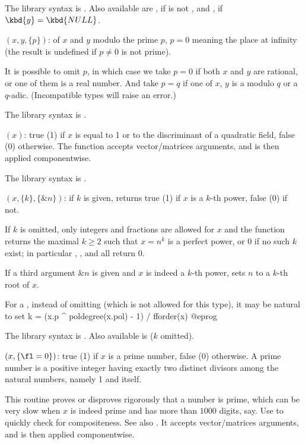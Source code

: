 The library syntax is .
Also available are , if  is not
, and , if $\kbd{y} = \kbd{NULL}$.

$(x,y,\{p\})$: \label{se:hilbert} of $x$ and $y$ modulo the prime $p$, $p=0$ meaning
the place at infinity (the result is undefined if $p\neq 0$ is not prime).

It is possible to omit $p$, in which case we take $p = 0$ if both $x$
and $y$ are rational, or one of them is a real number. And take $p = q$
if one of $x$, $y$ is a  modulo $q$ or a $q$-adic. (Incompatible
types will raise an error.)

The library syntax is .

$(x)$: \label{se:isfundamental}true (1) if $x$ is equal to 1 or to the discriminant of a quadratic
field, false (0) otherwise.
The function accepts vector/matrices arguments, and is then applied
componentwise.

The library syntax is .

$(x,\{k\},\{\&n\})$: \label{se:ispower}if $k$ is given, returns true (1) if $x$ is a $k$-th power, false
(0) if not.

If $k$ is omitted, only integers and fractions are allowed for $x$ and the
function returns the maximal $k \geq 2$ such that $x = n^k$ is a perfect
power, or 0 if no such $k$ exist; in particular ,
, and  all return $0$.

If a third argument $\&n$ is given and $x$ is indeed a $k$-th power, sets
$n$ to a $k$-th root of $x$.

\noindent For a  , instead of omitting  (which is
not allowed for this type), it may be natural to set
\bprog
k = (x.p ^ poldegree(x.pol) - 1) / fforder(x)
@eprog

The library syntax is .
Also available is
 ($k$ omitted).

$(x,\{\fl=0\})$: \label{se:isprime}true (1) if $x$ is a prime
number, false (0) otherwise. A prime number is a positive integer having
exactly two distinct divisors among the natural numbers, namely 1 and
itself.

This routine proves or disproves rigorously that a number is prime, which can
be very slow when $x$ is indeed prime and has more than $1000$ digits, say.
Use  to quickly check for compositeness. See also
. It accepts vector/matrices arguments, and is then applied
componentwise.

